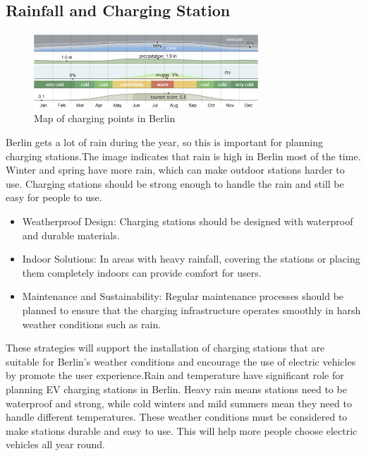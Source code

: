 \subsection{Rainfall and Charging Station}
\begin{figure}[hbt!]
\begin{center}
\includegraphics[width=0.75\textwidth]{Bilder/kaan3.png}
\caption{Map of charging points in Berlin}\label{fig:kaan3}
\end{center}
\end{figure}
Berlin gets a lot of rain during the year, so this is important for planning charging stations.The image indicates that rain is high in Berlin most of the time. Winter and spring have more rain, which can make outdoor stations harder to use.
Charging stations should be strong enough to handle the rain and still be easy for people to use.
\begin{itemize}
    \item Weatherproof Design: Charging stations should be designed with waterproof and durable materials.
    \item Indoor Solutions: In areas with heavy rainfall, covering the stations or placing them completely indoors can provide comfort for users.
    \item Maintenance and Sustainability: Regular maintenance processes should be planned to ensure that the charging infrastructure operates smoothly in harsh weather conditions such as rain.
    \end{itemize}
These strategies will support the installation of charging stations that are suitable for Berlin's weather conditions and encourage the use of electric vehicles by promote the user experience.Rain and temperature have significant role for planning EV charging stations in Berlin. Heavy rain means stations need to be waterproof and strong, while cold winters and mild summers mean they need to handle different temperatures. These weather conditions must be considered to make stations durable and easy to use. This will help more people choose electric vehicles all year round.
